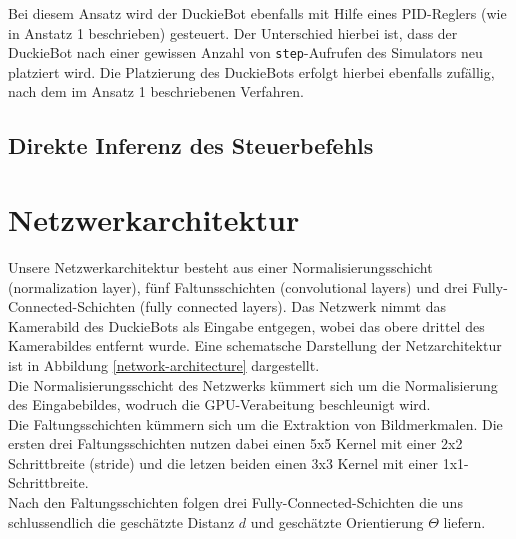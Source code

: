 Bei diesem Ansatz wird der DuckieBot ebenfalls mit Hilfe eines PID-Reglers (wie in Anstatz 1 beschrieben) gesteuert. Der Unterschied hierbei ist, dass der DuckieBot nach einer gewissen Anzahl von \texttt{step}-Aufrufen des Simulators neu platziert wird. Die Platzierung des DuckieBots erfolgt hierbei ebenfalls zufällig, nach dem im Ansatz 1 beschriebenen Verfahren. 

\subsection{Direkte Inferenz des Steuerbefehls}


\section{Netzwerkarchitektur}

Unsere Netzwerkarchitektur besteht aus einer Normalisierungsschicht (normalization layer), fünf Faltunsschichten (convolutional layers) und drei Fully-Connected-Schichten (fully connected layers). Das Netzwerk nimmt das  Kamerabild des DuckieBots als Eingabe entgegen, wobei das obere drittel des Kamerabildes entfernt wurde. Eine schematsche Darstellung der Netzarchitektur ist in Abbildung \ref{network-architecture} dargestellt. \\

Die Normalisierungsschicht des Netzwerks kümmert sich um die Normalisierung des Eingabebildes, wodruch die GPU-Verabeitung beschleunigt wird. \\

Die Faltungsschichten kümmern sich um die Extraktion von Bildmerkmalen. Die ersten drei Faltungsschichten nutzen dabei einen 5x5 Kernel mit einer 2x2 Schrittbreite (stride) und die letzen beiden einen 3x3 Kernel mit einer 1x1-Schrittbreite. \\

Nach den Faltungsschichten folgen drei Fully-Connected-Schichten die uns schlussendlich die geschätzte Distanz $d$ und geschätzte Orientierung $\Theta$ liefern.


